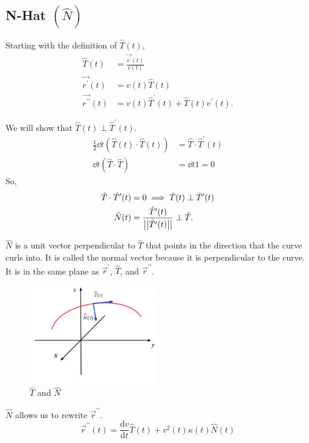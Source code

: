 \subsection{N-Hat $\left(\hat{N}\right)$}
Starting with the definition of $\hat{T}(t)$,
\begin{align*}
	\hat{T}(t) &= \frac{\vec{r^\prime}(t)}{v(t)} \\
	\vec{r^{\prime}}(t) &= v(t)\hat{T}(t) \\
	\vec{r^{\prime\prime}}(t) &= v(t)\hat{T}^{\prime}(t)+\hat{T}(t)v^{\prime}(t).
\end{align*}

\noindent
We will show that $\hat{T}(t) \perp \hat{T}^{\prime}(t)$.
\begin{align*}
	\frac{1}{2}\dd{}{t}\left(\hat{T}(t)\cdot\hat{T}(t)\right) &= \hat{T}\cdot\hat{T}^{\prime}(t) \\
	\dd{}{t}\left(\hat{T}\cdot\hat{T}\right) &= \dd{}{t}1 = 0
\end{align*}
So,
\begin{align*}
	\hat{T}\cdot\hat{T}^{\prime}(t) &= 0 \implies \hat{T}(t) \perp \hat{T}^{\prime}(t) \\
	\hat{N}(t) &= \frac{\hat{T}^{\prime}(t)}{\big\lvert \big\lvert \hat{T}^{\prime}(t) \big\rvert \big\rvert}\perp\hat{T}.
\end{align*}

\noindent
$\hat{N}$ is a unit vector perpendicular to $\hat{T}$ that points in the direction that the curve curls into.
It is called the normal vector because it is perpendicular to the curve.
It is in the same plane as $\vec{r}^\prime$, $\hat{T}$, and  $\vec{r}^{\prime\prime}$.

\begin{figure}[H]
	\label{that_nhat}
	\centering
	\includegraphics[width = 0.5\textwidth]{./Images/vectorValuedFunctions/TN.PNG}
	\caption{$\hat{T}$ and $\hat{N}$}
\end{figure}

\noindent
$\hat{N}$ allows us to rewrite $\vec{r}^{\prime\prime}$.\\
\begin{equation*}
	\vec{r}^{\prime\prime}(t)=\frac{\mathrm{d}v}{\mathrm{d}t}\hat{T}(t)+v^{2}(t)\kappa(t)\hat{N}(t)
\end{equation*}

